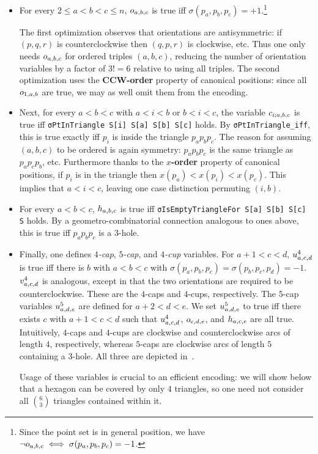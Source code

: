\begin{itemize}
  \item
    For every $2 \leq a < b < c \leq n$, $\orvar_{a,b,c}$ is true
    iff $\sigma(p_a,p_b,p_c) = +1$.\footnote{
    Since the point set is in general position,
    we have $\neg \orvar_{a,b,c} \iff \sigma(p_a, p_b, p_c) = -1$.}

    The first optimization observes that orientations are antisymmetric:
    if $(p,q,r)$ is counterclockwise then $(q,p,r)$ is clockwise, etc.
    Thus one only needs $\orvar_{a,b,c}$ for ordered triples $(a,b,c)$,
    reducing the number of orientation variables by a factor of $3! = 6$
    relative to using all triples. The second optimization uses the \textbf{CCW-order} property of canonical positions:
    since all $\orvar_{1,a,b}$ are true, we may as well omit them from the encoding.

  \item
    Next, for every $a < b < c$ with $a < i < b$ or $b < i < c$,
    the variable $\cvar_{i;a,b,c}$ is true
    iff \lstinline|σPtInTriangle S[i] S[a] S[b] S[c]| holds.
    By \lstinline|σPtInTriangle_iff|, this is true exactly
    iff $p_i$ is inside the triangle $p_ap_bp_c$.
    The reason for assuming $(a,b,c)$ to be ordered is again symmetry:
    $p_ap_bp_c$ is the same triangle as $p_ap_cp_b$, etc.
    Furthermore thanks to the \textbf{$x$-order} property of canonical positions,
    if $p_i$ is in the triangle
    then $x(p_a) < x(p_i) < x(p_c)$.
    This implies that $a < i < c$,
    leaving one case distinction permuting $(i,b)$.

  \item
    For every $a < b < c$,
    $\hvar_{a,b,c}$ is true
    iff \lstinline|σIsEmptyTriangleFor S[a] S[b] S[c] S| holds. 
    By a geometro-combinatorial connection analogous to ones above,
    this is true iff $p_ap_bp_c$ is a $3$-hole.

  \item
    Finally, one defines \emph{$4$-cap}, \emph{$5$-cap}, and \emph{$4$-cup} variables.
    For $a+1 < c < d$, $\uvar_{a,c,d}$ is true
    iff there is $b$ with $a < b < c$ with $\sigma(p_a,p_b,p_c) = \sigma(p_b,p_c,p_d) = -1$.
    $\vvar_{a,c,d}$ is analogous, except in that the two orientations are required to be counterclockwise.
    These are the $4$-caps and $4$-cups, respectively.
    The $5$-cap variables $\ufvar_{a,d,e}$
    are defined for $a+2 < d < e$.
    We set $\ufvar_{a,d,e}$ to true
    iff there exists $c$ with $a+1<c<d$
    such that $\uvar_{a,c,d}$, $\orvar_{c,d,e}$, and $\hvar_{a,c,e}$ are all true.
    Intuitively, $4$-caps and $4$-cups are clockwise and counterclockwise arcs of length $4$,
    respectively,
    whereas $5$-caps are clockwise arcs of length $5$ containing a $3$-hole.
    All three are depicted in~.

    Usage of these variables is crucial to an efficient encoding:
    we will show below that a hexagon can be covered by only $4$ triangles,
    so one need not consider all ${6\choose 3}$ triangles contained within it.
\end{itemize}

